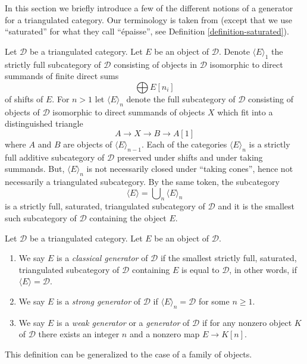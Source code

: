 \noindent
In this section we briefly introduce a few of the different notions
of a generator for a triangulated category. Our terminology is
taken from \cite{BvdB} (except that we use ``saturated'' for what
they call ``\'epaisse'', see Definition \ref{definition-saturated}).

\medskip\noindent
Let $\mathcal{D}$ be a triangulated category. Let $E$ be an object
of $\mathcal{D}$. Denote $\langle E \rangle_1$ the strictly full subcategory
of $\mathcal{D}$ consisting of objects in $\mathcal{D}$ isomorphic to
direct summands of finite direct sums
$$
\bigoplus E[n_i]
$$
of shifts of $E$. For $n > 1$ let $\langle E \rangle_n$ denote the full
subcategory of $\mathcal{D}$ consisting of objects of $\mathcal{D}$
isomorphic to direct summands of objects $X$ which fit into a distinguished
triangle
$$
A \to X \to B \to A[1]
$$
where $A$ and $B$ are objects of $\langle E \rangle_{n - 1}$. Each of
the categories $\langle E \rangle_n$ is a strictly full additive
subcategory of $\mathcal{D}$ preserved under shifts and under taking summands.
But, $\langle E \rangle_n$ is not necessarily closed under
``taking cones'', hence not necessarily a triangulated subcategory.
By the same token, the subcategory
$$
\langle E \rangle = \bigcup\nolimits_n \langle E \rangle_n
$$
is a strictly full, saturated, triangulated subcategory of $\mathcal{D}$
and it is the smallest such subcategory of $\mathcal{D}$ containing
the object $E$.

\begin{definition}
\label{definition-generators}
Let $\mathcal{D}$ be a triangulated category. Let $E$ be an object
of $\mathcal{D}$.
\begin{enumerate}
\item We say $E$ is a {\it classical generator} of $\mathcal{D}$
if the smallest strictly full, saturated, triangulated subcategory
of $\mathcal{D}$ containing $E$ is equal to $\mathcal{D}$, in
other words, if $\langle E \rangle = \mathcal{D}$.
\item We say $E$ is a {\it strong generator} of $\mathcal{D}$
if $\langle E \rangle_n = \mathcal{D}$ for some $n \geq 1$.
\item We say $E$ is a {\it weak generator} or a {\it generator}
of $\mathcal{D}$
if for any nonzero object $K$ of $\mathcal{D}$ there exists
an integer $n$ and a nonzero map $E \to K[n]$.
\end{enumerate}
\end{definition}

\noindent
This definition can be generalized to the case of a family of objects.


